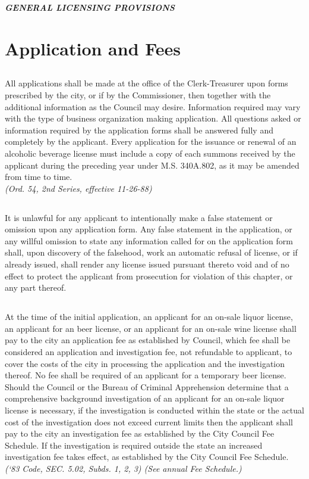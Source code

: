 \begin{center}
    \emph{\textbf{\LARGE{GENERAL LICENSING PROVISIONS}}}
\end{center}

\setcounter{section}{14}
\section{Application and Fees}
\subsection{}
All applications shall be made at the office of the Clerk-Treasurer upon forms prescribed by the city, or if by the Commissioner, then together with the additional information as the Council may desire. Information required may vary with the type of business organization making application. All questions asked or information required by the application forms shall be answered fully and completely by the applicant. Every application for the issuance or renewal of an alcoholic beverage license must include a copy of each summons received by the applicant during the preceding year under M.S. \textsection 340A.802, as it may be amended from time to time.\\
\emph{(Ord. 54, 2nd Series, effective 11-26-88)}
\subsection{}
It is unlawful for any applicant to intentionally make a false statement or omission upon any application form. Any false statement in the application, or any willful omission to state any information called for on the application form shall, upon discovery of the falsehood, work an automatic refusal of license, or if already issued, shall render any license issued pursuant thereto void and of no effect to protect the applicant from prosecution for violation of this chapter, or any part thereof.
\subsection{}
At the time of the initial application, an applicant for an on-sale liquor license, an applicant for an beer license, or an applicant for an on-sale wine license shall pay to the city an application fee as established by Council, which fee shall be considered an application and investigation fee, not refundable to applicant, to cover the costs of the city in processing the application and the investigation thereof. No fee shall be required of an applicant for a temporary beer license. Should the Council or the Bureau of Criminal Apprehension determine that a comprehensive background investigation of an applicant for an on-sale liquor license is necessary, if the investigation is conducted within the state or the actual cost of the investigation does not exceed current limits then the applicant shall pay to the city an investigation fee as established by the City Council Fee Schedule. If the investigation is required outside the state an increased investigation fee takes effect, as established by the City Council Fee Schedule.\\
\emph{(‘83 Code, SEC. 5.02, Subds. 1, 2, 3) (See annual Fee Schedule.)}
